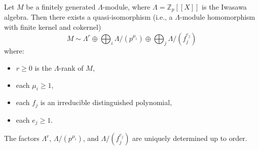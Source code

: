 Let $M$ be a finitely generated $\Lambda$-module, where $\Lambda = \mathbb{Z}_p[[X]]$ is the Iwasawa algebra. Then there exists a quasi-isomorphism (i.e., a $\Lambda$-module homomorphism with finite kernel and cokernel)
$$M \sim \Lambda^r \oplus \bigoplus_{i} \Lambda/(p^{\mu_i}) \oplus \bigoplus_{j} \Lambda/(f_j^{e_j})$$
where:
\begin{itemize}
\item $r \ge 0$ is the $\Lambda$-rank of $M$,
\item each $\mu_i \ge 1$,
\item each $f_j$ is an irreducible distinguished polynomial,
\item each $e_j \ge 1$.
\end{itemize}
The factors $\Lambda^r$, $\Lambda/(p^{\mu_i})$, and $\Lambda/(f_j^{e_j})$ are uniquely determined up to order.
